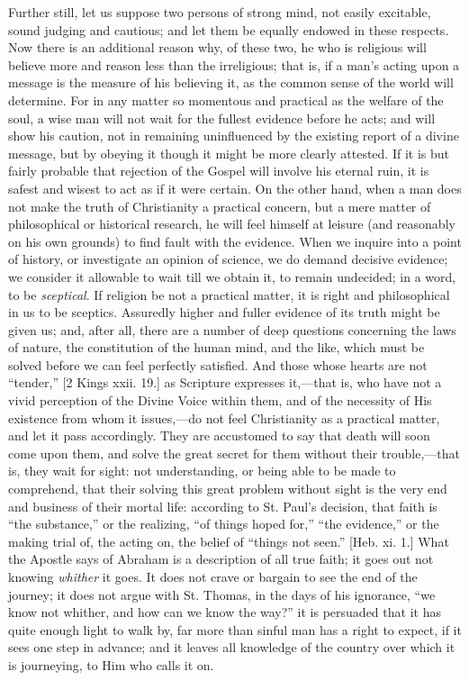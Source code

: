 Further still, let us suppose two persons of strong mind, not
easily excitable, sound judging and cautious; and let them be equally
endowed in these respects. Now there is an additional reason why, of
these two, he who is religious will believe more and reason less than
the irreligious; that is, if a man's acting upon a message is the
measure of his believing it, as the common sense of the world will
determine. For in any matter so momentous and practical as the welfare
of the soul, a wise man will not wait for the fullest evidence before
he acts; and will show his caution, not in remaining uninfluenced by
the existing report of a divine message, but by obeying it though it
might be more clearly attested. If it is but fairly probable that
rejection of the Gospel will involve his eternal ruin, it is safest
and wisest to act as if it were certain. On the other hand, when a man
does not make the truth of Christianity a practical concern, but a
mere matter of philosophical or historical research, he will feel
himself at leisure (and reasonably on his own grounds) to find fault
with the evidence. When we inquire into a point of history, or
investigate an opinion of science, we do demand decisive evidence; we
consider it allowable to wait till we obtain it, to remain undecided;
in a word, to be \emph{sceptical}. If religion be not a practical
matter, it is right and philosophical in us to be sceptics. Assuredly
higher and fuller evidence of its truth might be given us; and, after
all, there are a number of deep questions concerning the laws of
nature, the constitution of the human mind, and the like, which must
be solved before we can feel perfectly satisfied. And those whose
hearts are not ``tender,'' [2 Kings xxii. 19.] as Scripture
expresses it,—that is, who have not a vivid perception of the Divine
Voice within them, and of the necessity of His existence from whom it
issues,—do not feel Christianity as a practical matter, and let it
pass accordingly. They are accustomed to say that death will soon come
upon them, and solve the great secret for them without their trouble,—that
is, they wait for sight: not understanding, or being able to be made
to comprehend, that their solving this great problem without sight is
the very end and business of their mortal life: according to St.
Paul's decision, that faith is ``the substance,'' or the
realizing, ``of things hoped for,'' ``the evidence,''
or the making trial of, the acting on, the belief of ``things not
seen.'' [Heb. xi. 1.] What the Apostle says of Abraham is a
description of all true faith; it goes out not knowing \emph{whither}
it goes. It does not crave or bargain to see the end of the journey;
it does not argue with St. Thomas, in the days of his ignorance,
``we know not whither, and how can we know the way?'' it is
persuaded that it has quite enough light to walk by, far more than
sinful man has a right to expect, if it sees one step in advance; and
it leaves all knowledge of the country over which it is journeying, to
Him who calls it on.

